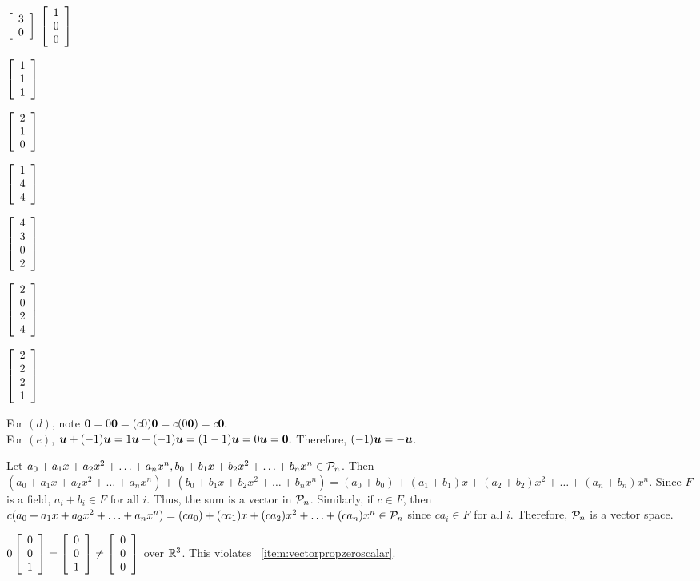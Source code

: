 \begin{enumerate}[!HW!, start=1]
\begin{multicols}{6}
\item $\vr{3\\0}$ %
\itemspade $\vr{1\\0\\0}$  
\item $\vr{1\\1\\1}$ %
\item $\vr{2\\1\\0}$  %
\item $\vr{1\\4\\4}$  %
\end{multicols}
\begin{multicols}{6}
\itemspade $\vr{4\\3\\0\\2}$ 
\item $\vr{2\\0\\2\\4}$ %
\item $\vr{2\\2\\2\\1}$ %
\end{multicols}

\itemspade For $(d)$, note $\bb 0 = 0\bb 0 = (c0)\bb 0  = c(0\bb 0) = c\bb0.$\\
 For $(e)$, $\bb u + (-1)\bb u = 1\bb u + (-1)\bb u = (1-1)\bb u = 0\bb u = \bb 0.$ Therefore, $(-1)\bb u = -\bb u$.

\itemspade Let $a_0 + a_1x + a_2x^2 + \ldots + a_nx^n, b_0 + b_1x + b_2x^2 + \ldots + b_nx^n \in \P_n$. Then $(a_0 + a_1x + a_2x^2 + \ldots + a_nx^n) + (b_0 + b_1x + b_2x^2 + \ldots + b_nx^n) = (a_0+b_0) + (a_1+b_1)x + (a_2+b_2)x^2 + \ldots + (a_n+b_n)x^n$. Since $F$ is a field, $a_i+b_i\in F$ for all $i$. Thus, the sum is a vector in $\P_n$. Similarly, if $c\in F$, then $c(a_0 + a_1x + a_2x^2 + \ldots + a_nx^n) = (ca_0) + (ca_1)x + (ca_2)x^2 + \ldots + (ca_n)x^n\in \P_n$ since $ca_i\in F$ for all $i$. Therefore, $\P_n$ is a vector space.

\itemspade $0\vr{0\\0\\1} = \vr{0\\0\\1} \neq \vr{0\\0\\0}$ over $\R^3$. This violates \ \ref{item:vectorpropzeroscalar}.


\end{enumerate}
